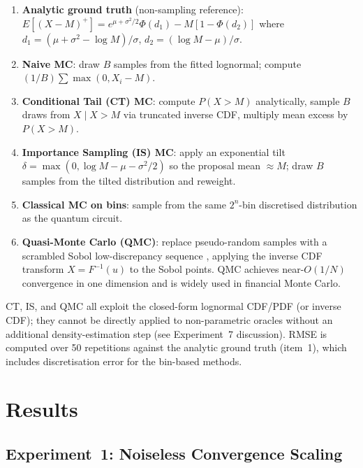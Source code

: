 \documentclass[11pt,a4paper]{article}
\begin{document}
\begin{enumerate}
    \item \textbf{Analytic ground truth} (non-sampling reference): $E[(X-M)^+] = e^{\mu+\sigma^2/2}\Phi(d_1) - M[1 - \Phi(d_2)]$ where $d_1 = (\mu + \sigma^2 - \log M)/\sigma$, $d_2 = (\log M - \mu)/\sigma$.
    \item \textbf{Naive MC}: draw $B$ samples from the fitted lognormal; compute $(1/B)\sum \max(0, X_i - M)$.
    \item \textbf{Conditional Tail (CT) MC}: compute $P(X > M)$ analytically, sample $B$ draws from $X \mid X > M$ via truncated inverse CDF, multiply mean excess by $P(X > M)$.
    \item \textbf{Importance Sampling (IS) MC}: apply an exponential tilt $\delta = \max(0, \log M - \mu - \sigma^2/2)$ so the proposal mean $\approx M$; draw $B$ samples from the tilted distribution and reweight.
    \item \textbf{Classical MC on bins}: sample from the same $2^n$-bin discretised distribution as the quantum circuit.
    \item \textbf{Quasi-Monte Carlo (QMC)}: replace pseudo-random samples with a scrambled Sobol low-discrepancy sequence \cite{Glasserman2003}, applying the inverse CDF transform $X = F^{-1}(u)$ to the Sobol points. QMC achieves near-$O(1/N)$ convergence in one dimension and is widely used in financial Monte Carlo.
\end{enumerate}

CT, IS, and QMC all exploit the closed-form lognormal CDF/PDF (or inverse CDF); they cannot be directly applied to non-parametric oracles without an additional density-estimation step (see Experiment~7 discussion). RMSE is computed over 50 repetitions against the analytic ground truth (item~1), which includes discretisation error for the bin-based methods.


\section{Results}
\label{sec:results}

\subsection{Experiment~1: Noiseless Convergence Scaling}
\end{document}
